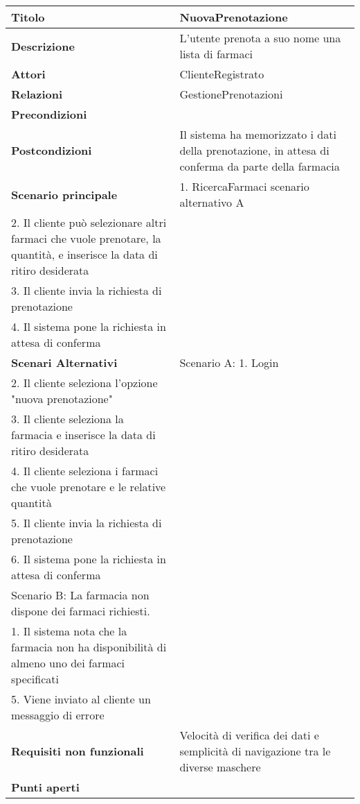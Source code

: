 \begin{tabular} {|P{4.5cm}|P{12.5cm}|}
\hline
  \textbf{Titolo} & NuovaPrenotazione\\
\hline
  \textbf{Descrizione} & L'utente prenota a suo nome una lista di farmaci\\
\hline
  \textbf{Attori} & ClienteRegistrato\\
\hline
  \textbf{Relazioni} & GestionePrenotazioni\\
\hline
  \textbf{Precondizioni} &\\
\hline
  \textbf{Postcondizioni} & Il sistema ha memorizzato i dati della prenotazione, in attesa di conferma da parte della farmacia\\
\hline
  \textbf{Scenario principale} &
    1. RicercaFarmaci scenario alternativo A \\
    2. Il cliente può selezionare altri farmaci che vuole prenotare, la quantità, e inserisce la data di ritiro desiderata \\
    3. Il cliente invia la richiesta di prenotazione \\
    4. Il sistema pone la richiesta in attesa di conferma\\
\hline
  \textbf{Scenari Alternativi} & 
    Scenario A:
      1. Login \\
      2. Il cliente seleziona l'opzione "nuova prenotazione" \\
      3. Il cliente seleziona la farmacia e inserisce la data di ritiro desiderata \\
      4. Il cliente seleziona i farmaci che vuole prenotare e le relative quantità\\
      5. Il cliente invia la richiesta di prenotazione \\
      6. Il sistema pone la richiesta in attesa di conferma\\
    Scenario B: La farmacia non dispone dei farmaci richiesti. \\ 
    1. Il sistema nota che la farmacia non ha disponibilità di almeno uno dei farmaci specificati \\ 
    5. Viene inviato al cliente un messaggio di errore\\
\hline
  \textbf{Requisiti non funzionali} & Velocità di verifica dei dati e semplicità di navigazione tra le diverse maschere\\
\hline
  \textbf{Punti aperti} &\\
\hline
\end{tabular}
\hfill
\break

